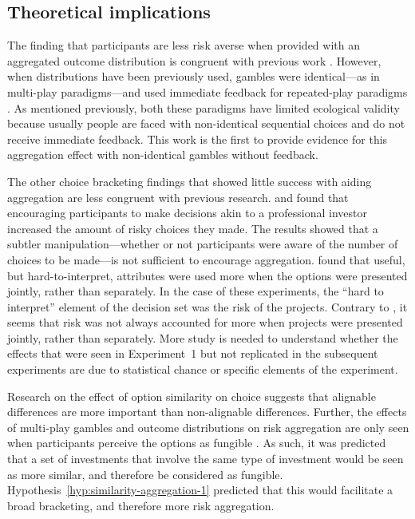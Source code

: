 \documentclass[a4paper, nobind, dvipsnames]{templates/ociamthesis}
\theoremstyle{definition}
\theoremstyle{definition}
\theoremstyle{definition}
\theoremstyle{definition}
\theoremstyle{remark}
\begin{document}
\subsection{Theoretical implications}

The finding that participants are less risk averse when provided with an
aggregated outcome distribution is congruent with previous work \autocite[e.g.,][]{redelmeier1992}. However, when distributions have been previously used, gambles
were identical---as in multi-play paradigms---and used immediate feedback for
repeated-play paradigms \autocite[e.g.,][]{benartzi1999}. As mentioned previously, both
these paradigms have limited ecological validity because usually people are
faced with non-identical sequential choices and do not receive immediate
feedback. This work is the first to provide evidence for this aggregation effect
with non-identical gambles without feedback.

The other choice bracketing findings that showed little success with aiding
aggregation are less congruent with previous research. \textcite{sokolhessner2009} and
\textcite{sokolhessner2012} found that encouraging participants to make decisions akin to
a professional investor increased the amount of risky choices they made. The
results showed that a subtler manipulation---whether or not participants were
aware of the number of choices to be made---is not sufficient to encourage
aggregation. \textcite{hsee1999} found that useful, but hard-to-interpret, attributes were
used more when the options were presented jointly, rather than separately. In
the case of these experiments, the ``hard to interpret'' element of the decision
set was the risk of the projects. Contrary to \textcite{hsee1999}, it seems that risk was
not always accounted for more when projects were presented jointly, rather than
separately. More study is needed to understand whether the effects that were
seen in Experiment~1 but not replicated in the subsequent experiments are due to
statistical chance or specific elements of the experiment.

Research on the effect of option similarity on choice \autocite[e.g.,][]{markman1995}
suggests that alignable differences are more important than non-alignable
differences. Further, the effects of multi-play gambles and outcome
distributions on risk aggregation are only seen when participants perceive the
options as fungible \autocite[e.g.,][]{dekay2005}. As such, it was predicted that a set of
investments that involve the same type of investment would be seen as more
similar, and therefore be considered as fungible.
Hypothesis~\ref{hyp:similarity-aggregation-1} predicted that this would
facilitate a broad bracketing, and therefore more risk aggregation.
\end{document}

